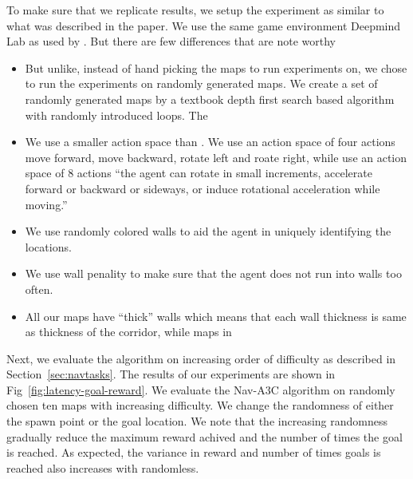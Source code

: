 To make sure that we replicate \cite{MiPaViICLR2017} results, we setup the experiment as similar to what was described in the paper. We use the same game environment Deepmind Lab \cite{BeLeTeARXIV2016} as used by \cite{MiPaViICLR2017}. But there are few differences that are note worthy
\begin{itemize}
\item But unlike, \cite{MiPaViICLR2017} instead of hand picking the maps to run experiments on, we chose to run the experiments on randomly generated maps.
We create a set of randomly generated maps by a textbook depth first search based algorithm with randomly introduced loops. The 
\item We use a smaller action space than \cite{MiPaViICLR2017}. We use an action space of four actions move forward, move backward, rotate left and roate right, while \cite{MiPaViICLR2017} use an action space of 8 actions ``the agent can rotate in small increments, accelerate forward or backward or
sideways, or induce rotational acceleration while moving.''
\item We use randomly colored walls to aid the agent in uniquely identifying the locations.
\item We use wall penality to make sure that the agent does not run into walls too often.
\item All our maps have ``thick'' walls which means that each wall thickness is same as thickness of the corridor, while maps in \cite{MiPaViICLR2017}
\end{itemize}

Next, we evaluate the algorithm on increasing order of difficulty as described in Section~\ref{sec:navtasks}. The results of our experiments are shown in Fig~\ref{fig:latency-goal-reward}.
We evaluate the Nav-A3C\cite{MiPaViICLR2017} algorithm on randomly chosen ten maps with increasing difficulty.
We change the randomness of either the spawn point or the goal location.
We note that the increasing randomness gradually reduce the maximum reward achived and the number of times the goal is reached. As expected, the variance in reward and number of times goals is reached also increases with randomless.

